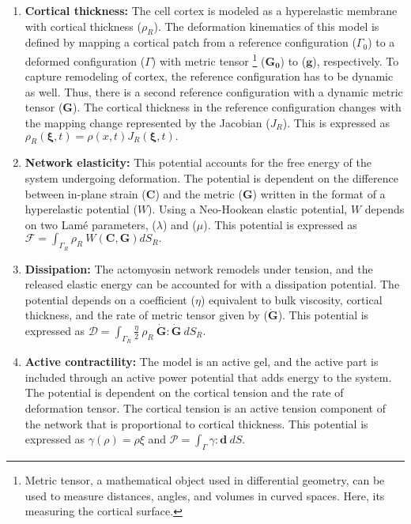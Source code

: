 \begin{enumerate}
	\item \textbf{Cortical thickness:} The cell cortex is modeled as a hyperelastic membrane with cortical thickness ($\rho_R$). The deformation kinematics of this model is defined by mapping a cortical patch from a reference configuration ($\Gamma_0$) to a deformed configuration ($\Gamma$) with metric tensor \footnote{Metric  tensor, a mathematical object used in differential geometry, can be used to measure distances, angles, and volumes in curved spaces. Here, its measuring the cortical surface.} ($\mathbf{G_0}$) to ($\mathbf{g}$), respectively. To capture remodeling of cortex, the reference configuration has to be dynamic as well. Thus, there is a second reference configuration with a dynamic metric tensor ($\mathbf{G}$). The cortical thickness in the reference configuration changes with the mapping change represented by the Jacobian ($J_R$). This is expressed as 
	$\rho_R(\mathbf{\xi}, t) = \rho(x,t)J_R(\mathbf{\xi},t).$
	\item \textbf{Network elasticity:} This potential accounts for the free energy of the system undergoing deformation. The potential is dependent on the difference between in-plane strain ($\mathbf{C}$) and the metric ($\mathbf{G}$) written in the format of a hyperelastic potential ($W$). Using a Neo-Hookean elastic potential, $W$ depends on two Lamé parameters, ($\lambda$) and ($\mu$). This potential is expressed as $\mathcal{F} = \int_{\Gamma_R} \rho_R \ W(\mathbf{C,G})dS_R.$
	\item \textbf{Dissipation:} The actomyosin network remodels under tension, and the released elastic energy can be accounted for with a dissipation potential. The potential depends on a coefficient ($\eta$) equivalent to bulk viscosity, cortical thickness, and the rate of metric tensor given by ($\dot{\mathbf{G}}$). This potential is expressed as $\mathcal{D} = \int_{\Gamma_R} \frac{\eta}{2}\ \rho_R \ \mathbf{\dot{G}}:\mathbf{\dot{G}} \ dS_R.$
	\item \textbf{Active contractility:} The model is an active gel, and the active part is included through an active power potential that adds energy to the system. The potential is dependent on the cortical tension and the rate of deformation tensor. The cortical tension is an active tension component of the network that is proportional to cortical thickness. This potential is expressed as $\gamma(\rho) = \rho \xi$ and $\mathcal{P} = \int_{\Gamma} \gamma : \mathbf{d} \ dS.$
	
\end{enumerate}

